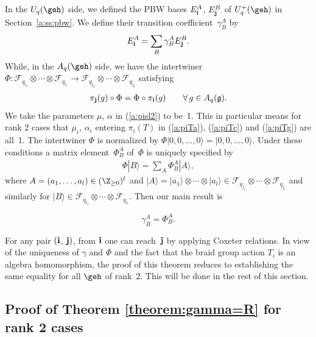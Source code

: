 In the $U_q(\geh)$ side, we def\/ined
the PBW bases
$E_{\bf i}^A$, $E_{\bf j}^B$ of $U_q^+(\geh)$ in Section~\ref{a:ss:pbw}.
We def\/ine their transition coef\/f\/icient~$\gamma^A_B$ by
\begin{gather*}
E_{\bf i}^A=\sum_B \gamma^A_B E_{\bf j}^B.
\end{gather*}
While, in the $A_q(\geh)$ side, we have the intertwiner
$\Phi:
\mathcal{F}_{q_{i_1}}\otimes \cdots \otimes \mathcal{F}_{q_{i_l}}
\rightarrow
\mathcal{F}_{q_{j_1}}\otimes \cdots \otimes \mathcal{F}_{q_{j_l}}$
satisfying
\begin{gather}\label{a:piphi}
\pi_{\bf j}(g)\circ \Phi = \Phi \circ \pi_{\bf i}(g)\qquad
\forall\, g \in A_q(\mathfrak{g}).
\end{gather}
We take the parameters
$\mu$, $\alpha$ in (\ref{a:pisl2}) to be~1.
This in particular means for rank 2 cases that $\mu_i$, $\alpha_i$
entering $\pi_i(T)$ in (\ref{a:piTa}), (\ref{a:piTc}) and
(\ref{a:piTg}) are all~1.
The intertwiner $\Phi$ is normalized
by $\Phi |0,0,\ldots, 0\rangle =  |0,0,\ldots, 0\rangle$.
Under these conditions a matrix element~$\Phi^A_B$ of~$\Phi$
is uniquely specif\/ied by
\begin{gather*}
\Phi |B\rangle=\sum_A \Phi^A_B |A\rangle,
\end{gather*}
where $A=(a_1, \ldots, a_l) \in (\Z_{\ge 0})^l$ and
$|A\rangle = |a_1\rangle \otimes \cdots \otimes |a_l\rangle
\in \mathcal{F}_{q_{j_1}}\otimes \cdots \otimes \mathcal{F}_{q_{j_l}}$
and similarly for $|B\rangle
\in \mathcal{F}_{q_{i_1}}\otimes \cdots \otimes \mathcal{F}_{q_{i_l}}$.
Then our main result is
\begin{theorem}\label{theorem:gamma=R}
\[
\gamma^A_B=\Phi^A_B.
\]
\end{theorem}

For any pair $({\bf i}$, ${\bf j})$, from ${\bf i}$ one can reach~${\bf j}$ by applying Coxeter relations.
In view of the uniqueness of $\gamma$ and $\Phi$
and the fact that
the braid group action $T_i$ is an algebra homomorphism,
the proof of this theorem reduces to
establishing the same equality for all $\geh$ of rank~2.
This will  be done in the rest of this section.

\subsection{Proof of Theorem \ref{theorem:gamma=R} for rank 2 cases}

